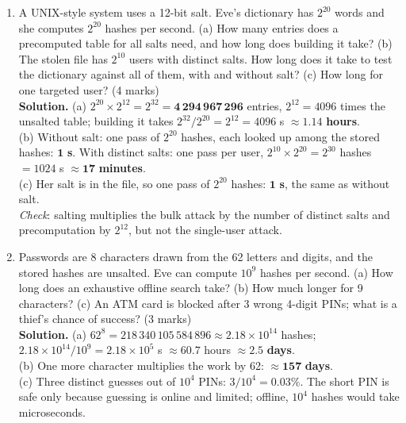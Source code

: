 \begin{enumerate}[leftmargin=1.6em,itemsep=4pt]
  \item A UNIX-style system uses a 12-bit salt. Eve's dictionary has $2^{20}$ words and she computes $2^{20}$ hashes per second. (a) How many entries does a precomputed table for all salts need, and how long does building it take? (b) The stolen file has $2^{10}$ users with distinct salts. How long does it take to test the dictionary against all of them, with and without salt? (c) How long for one targeted user? \hfill (4 marks)\\
  \textbf{Solution.} (a) $2^{20} \times 2^{12} = 2^{32} = \mathbf{4\,294\,967\,296}$ entries, $2^{12} = 4096$ times the unsalted table; building it takes $2^{32}/2^{20} = 2^{12} = 4096$ s $\approx \mathbf{1.14}$ \textbf{hours}.\\
  (b) Without salt: one pass of $2^{20}$ hashes, each looked up among the stored hashes: $\mathbf{1}$ \textbf{s}. With distinct salts: one pass per user, $2^{10} \times 2^{20} = 2^{30}$ hashes $= 1024$ s $\approx \mathbf{17}$ \textbf{minutes}.\\
  (c) Her salt is in the file, so one pass of $2^{20}$ hashes: $\mathbf{1}$ \textbf{s}, the same as without salt.\\
  \emph{Check}: salting multiplies the bulk attack by the number of distinct salts and precomputation by $2^{12}$, but not the single-user attack.

  \item Passwords are 8 characters drawn from the 62 letters and digits, and the stored hashes are unsalted. Eve can compute $10^9$ hashes per second. (a) How long does an exhaustive offline search take? (b) How much longer for 9 characters? (c) An ATM card is blocked after 3 wrong 4-digit PINs; what is a thief's chance of success? \hfill (3 marks)\\
  \textbf{Solution.} (a) $62^8 = 218\,340\,105\,584\,896 \approx 2.18 \times 10^{14}$ hashes; $2.18 \times 10^{14} / 10^9 = 2.18 \times 10^5$ s $\approx 60.7$ hours $\approx \mathbf{2.5}$ \textbf{days}.\\
  (b) One more character multiplies the work by 62: $\approx \mathbf{157}$ \textbf{days}.\\
  (c) Three distinct guesses out of $10^4$ PINs: $3/10^4 = \mathbf{0.03\%}$. The short PIN is safe only because guessing is online and limited; offline, $10^4$ hashes would take microseconds.


\end{enumerate}
